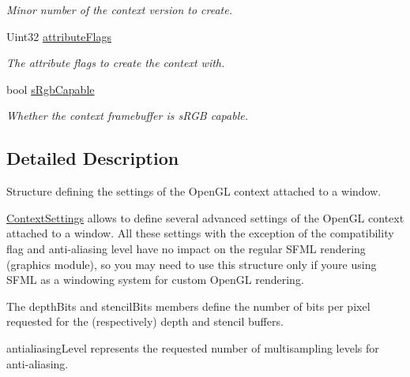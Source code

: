 \begin{DoxyCompactItemize}
\begin{DoxyCompactList}\small\item\em Minor number of the context version to create. \end{DoxyCompactList}\item 
\mbox{\label{structsf_1_1_context_settings_a0ef3fc53802bc0197d2739466915ada5}} 
Uint32 \mbox{\hyperlink{structsf_1_1_context_settings_a0ef3fc53802bc0197d2739466915ada5}{attribute\+Flags}}
\begin{DoxyCompactList}\small\item\em The attribute flags to create the context with. \end{DoxyCompactList}\item 
\mbox{\label{structsf_1_1_context_settings_ac93b041bfb6cbd36034997797708a0a3}} 
bool \mbox{\hyperlink{structsf_1_1_context_settings_ac93b041bfb6cbd36034997797708a0a3}{s\+Rgb\+Capable}}
\begin{DoxyCompactList}\small\item\em Whether the context framebuffer is s\+R\+GB capable. \end{DoxyCompactList}\end{DoxyCompactItemize}


\subsection{Detailed Description}
Structure defining the settings of the Open\+GL context attached to a window. 

\begin{DoxyVerb}\end{DoxyVerb}


\mbox{\hyperlink{structsf_1_1_context_settings}{Context\+Settings}} allows to define several advanced settings of the Open\+GL context attached to a window. All these settings with the exception of the compatibility flag and anti-\/aliasing level have no impact on the regular S\+F\+ML rendering (graphics module), so you may need to use this structure only if you\textquotesingle{}re using S\+F\+ML as a windowing system for custom Open\+GL rendering.

The depth\+Bits and stencil\+Bits members define the number of bits per pixel requested for the (respectively) depth and stencil buffers.

antialiasing\+Level represents the requested number of multisampling levels for anti-\/aliasing.

